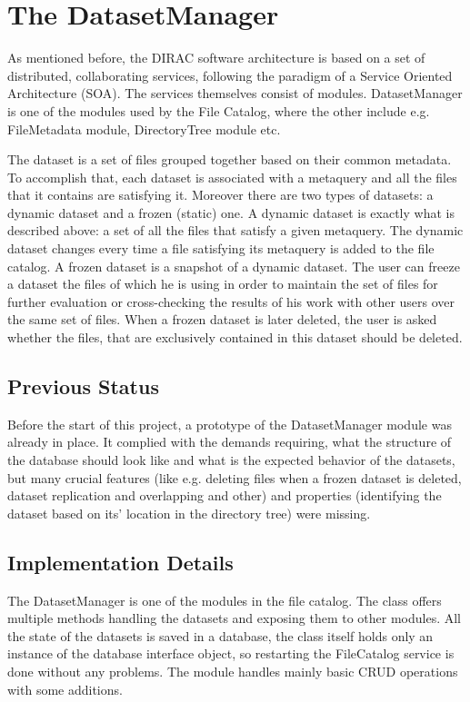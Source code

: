 \chapter{The DatasetManager}
\label{chap:Dataset}

As mentioned before, the DIRAC software architecture is based on a set of distributed,
collaborating services, following the paradigm of a Service
Oriented Architecture (SOA). The services themselves consist of
modules. DatasetManager is one of the modules used by the File Catalog, where the other include
e.g. FileMetadata module, DirectoryTree module etc. 

The dataset is a set of files grouped together based on their common metadata. To accomplish
that, each dataset is associated with a metaquery and all the files that it contains are
satisfying it. Moreover there are two types of datasets: a dynamic dataset and 
a frozen (static) one. A dynamic dataset is exactly what is described above: a set of all the
files that satisfy a given metaquery. The dynamic dataset changes every time a file satisfying
its metaquery is added to the file catalog. A frozen dataset is a snapshot of a dynamic dataset. The
user can freeze a dataset the files of which he is using in order to maintain the set of files for
further evaluation or cross-checking the results of his work with other users over the same
set of files. When a frozen dataset is later deleted, the user is asked whether the files, that 
are exclusively contained in this dataset should be deleted. 

\section{Previous Status}
Before the start of this project, a prototype of the DatasetManager module was already 
in place. It complied with the demands requiring, what the structure of the database 
should look like and what is the 
expected behavior of the datasets, but many crucial features (like e.g. deleting files when a 
frozen dataset is deleted, dataset replication and overlapping and other) and properties (identifying
the dataset based on its' location in the directory tree) were missing.

\section{Implementation Details}

The DatasetManager is  one of the modules in the file catalog. The class offers
multiple methods handling the datasets and exposing them to other modules. All the state of the 
datasets is saved in a database, the class itself holds only an instance of the database interface
object, so restarting the FileCatalog service is done without any problems. The module handles mainly
basic CRUD operations with some additions.

